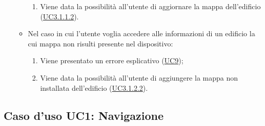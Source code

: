 \documentclass[../AnalisiDeiRequisiti.tex]{subfiles}
\begin{document}
\begin{itemize}
\begin{itemize}
\begin{enumerate}
			\item Viene data la possibilità all'utente di aggiornare la mappa dell'edificio (\hyperlink{UC3.1.1.2}{UC3.1.1.2}).
		\end{enumerate}
		\item Nel caso in cui l'utente voglia accedere alle informazioni di un edificio la cui mappa non risulti presente nel dispositivo: 
		\begin{enumerate}
			\item Viene presentato un errore esplicativo (\hyperlink{UC9}{UC9});
			\item Viene data la possibilità all'utente di aggiungere la mappa non installata dell'edificio (\hyperlink{UC3.1.2.2}{UC3.1.2.2}).
		\end{enumerate}
	\end{itemize}
\end{itemize}
\hypertarget{UC1}{}
\subsection{Caso d'uso UC1: Navigazione}
\end{document}
